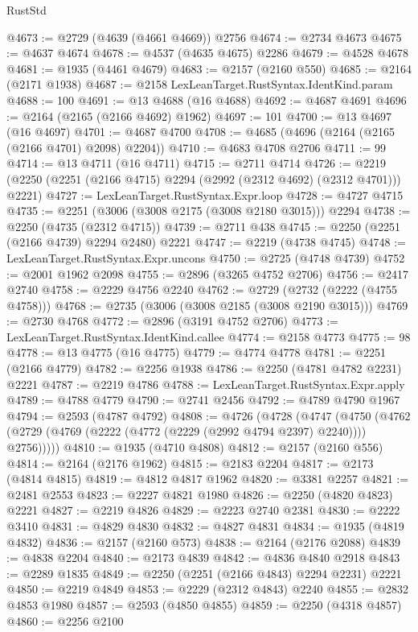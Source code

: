 \begin{lexlean}{RustStd}
\begin{coremodule}
@4673 := @2729 (@4639 (@4661 @4669)) @2756
@4674 := @2734 @4673
@4675 := @4637 @4674
@4678 := @4537 (@4635 @4675) @2286
@4679 := @4528 @4678
@4681 := @1935 (@4461 @4679)
@4683 := @2157 (@2160 @550)
@4685 := @2164 (@2171 @1938)
@4687 := @2158 LexLeanTarget.RustSyntax.IdentKind.param
@4688 := 100
@4691 := @13 @4688 (@16 @4688)
@4692 := @4687 @4691
@4696 := @2164 (@2165 (@2166 @4692) @1962)
@4697 := 101
@4700 := @13 @4697 (@16 @4697)
@4701 := @4687 @4700
@4708 := @4685 (@4696 (@2164 (@2165 (@2166 @4701) @2098) @2204))
@4710 := @4683 @4708 @2706
@4711 := 99
@4714 := @13 @4711 (@16 @4711)
@4715 := @2711 @4714
@4726 := @2219 (@2250 (@2251 (@2166 @4715) @2294 (@2992 (@2312 @4692) (@2312 @4701))) @2221)
@4727 := LexLeanTarget.RustSyntax.Expr.loop
@4728 := @4727 @4715
@4735 := @2251 (@3006 (@3008 @2175 (@3008 @2180 @3015))) @2294
@4738 := @2250 (@4735 (@2312 @4715))
@4739 := @2711 @438
@4745 := @2250 (@2251 (@2166 @4739) @2294 @2480) @2221
@4747 := @2219 (@4738 @4745)
@4748 := LexLeanTarget.RustSyntax.Expr.uncons
@4750 := @2725 (@4748 @4739)
@4752 := @2001 @1962 @2098
@4755 := @2896 (@3265 @4752 @2706)
@4756 := @2417 @2740
@4758 := @2229 @4756 @2240
@4762 := @2729 (@2732 (@2222 (@4755 @4758)))
@4768 := @2735 (@3006 (@3008 @2185 (@3008 @2190 @3015)))
@4769 := @2730 @4768
@4772 := @2896 (@3191 @4752 @2706)
@4773 := LexLeanTarget.RustSyntax.IdentKind.callee
@4774 := @2158 @4773
@4775 := 98
@4778 := @13 @4775 (@16 @4775)
@4779 := @4774 @4778
@4781 := @2251 (@2166 @4779)
@4782 := @2256 @1938
@4786 := @2250 (@4781 @4782 @2231) @2221
@4787 := @2219 @4786
@4788 := LexLeanTarget.RustSyntax.Expr.apply
@4789 := @4788 @4779
@4790 := @2741 @2456
@4792 := @4789 @4790 @1967
@4794 := @2593 (@4787 @4792)
@4808 := @4726
    (@4728
      (@4747
        (@4750 (@4762 (@2729 (@4769 (@2222 (@4772 (@2229 (@2992 @4794 @2397) @2240)))) @2756)))))
@4810 := @1935 (@4710 @4808)
@4812 := @2157 (@2160 @556)
@4814 := @2164 (@2176 @1962)
@4815 := @2183 @2204
@4817 := @2173 (@4814 @4815)
@4819 := @4812 @4817 @1962
@4820 := @3381 @2257
@4821 := @2481 @2553
@4823 := @2227 @4821 @1980
@4826 := @2250 (@4820 @4823) @2221
@4827 := @2219 @4826
@4829 := @2223 @2740 @2381
@4830 := @2222 @3410
@4831 := @4829 @4830
@4832 := @4827 @4831
@4834 := @1935 (@4819 @4832)
@4836 := @2157 (@2160 @573)
@4838 := @2164 (@2176 @2088)
@4839 := @4838 @2204
@4840 := @2173 @4839
@4842 := @4836 @4840 @2918
@4843 := @2289 @1835
@4849 := @2250 (@2251 (@2166 @4843) @2294 @2231) @2221
@4850 := @2219 @4849
@4853 := @2229 (@2312 @4843) @2240
@4855 := @2832 @4853 @1980
@4857 := @2593 (@4850 @4855)
@4859 := @2250 (@4318 @4857)
@4860 := @2256 @2100

\end{coremodule}
\end{lexlean}
